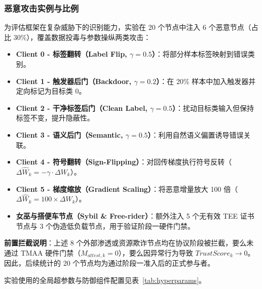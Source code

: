 \documentclass[11pt, a4paper, UTF8, fontset=fandol]{ctexart}
\begin{document}
\subsubsection{恶意攻击实例与比例}
为评估框架在复杂威胁下的识别能力，实验在 20 个节点中注入 6 个恶意节点（占比 30\%），覆盖数据投毒与参数操纵两类攻击：
\begin{itemize}
    \item \textbf{Client 0 - 标签翻转（Label Flip, $\gamma=0.5$）}：将部分样本标签映射到错误类别。
    \item \textbf{Client 1 - 触发器后门（Backdoor, $\gamma=0.2$）}：在 20\% 样本中加入触发器并定向标记为目标类 $0$。
    \item \textbf{Client 2 - 干净标签后门（Clean Label, $\gamma=0.5$）}：扰动目标类输入但保持标签不变，提升隐蔽性。
    \item \textbf{Client 3 - 语义后门（Semantic, $\gamma=0.5$）}：利用自然语义偏置诱导错误关联。
    \item \textbf{Client 4 - 符号翻转（Sign-Flipping）}：对回传梯度执行符号反转（$\Delta \widehat{W}_k = - \gamma \cdot \Delta W_k$）。
    \item \textbf{Client 5 - 梯度缩放（Gradient Scaling）}：将恶意增量放大 100 倍（$\Delta \widehat{W}_k = 100 \times \Delta W_k$）。
    \item \textbf{女巫与搭便车节点（Sybil \& Free-rider）}：额外注入 5 个无有效 TEE 证书节点与 3 个伪造低负载节点，用于验证阶段一硬件门禁。
\end{itemize}

\textbf{前置拦截说明}：上述 8 个外部渗透或资源欺诈节点均在协议阶段被拦截，要么未通过 TMAA 硬件门禁（$M_{attest,k}=0$），要么因异常行为导致 $TrustScore_k \to 0$。因此，后续统计的 20 个节点均为通过阶段一准入后的正式参与者。

实验使用的全局超参数与防御组件配置见表~\ref{tab:hyperparams}。
\end{document}
